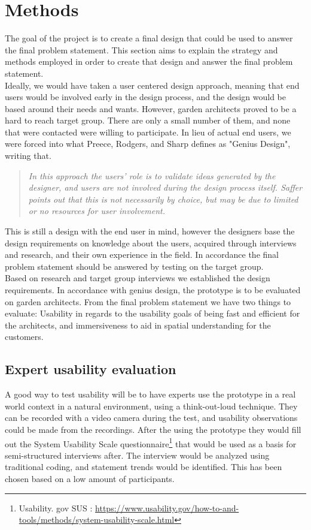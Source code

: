 \chapter{Methods}
\label{chp:methods}
The goal of the project is to create a final design that could be used to answer the final problem statement. This section aims to explain the strategy and methods employed in order to create that design and answer the final problem statement.\\

Ideally, we would have taken a user centered design approach, meaning that end users would be involved early in the design process, and the design would be based around their needs and wants. However, garden architects proved to be a hard to reach target group. There are only a small number of them, and none that were contacted were willing to participate. In lieu of actual end users, we were forced into what Preece, Rodgers, and Sharp defines as "Genius Design"\cite[p.~346]{interactionDesign}, writing that.\\
	\begin{quote}
	\textit{In this approach the users’ role is to validate ideas generated by the designer, and users are not involved during the design process itself. Saffer points out that this is not necessarily by choice, but may be due to limited or no resources for user involvement.}\\
	\end{quote}

This is still a design with the end user in mind, however the designers base the design requirements on knowledge about the users, acquired through interviews and research, and their own experience in the field. In accordance the final problem statement should be answered by testing on the target group.\\

Based on research and target group interviews we established the design requirements. In accordance with genius design, the prototype is to be evaluated on garden architects. From the final problem statement we have two things to evaluate: Usability in regards to the usability goals of being fast and efficient for the architects, and immersiveness to aid in spatial understanding for the customers.

\section{Expert usability evaluation}
A good way to test usability will be to have experts use the prototype in a real world context in a natural environment, using a think-out-loud technique. They can be recorded with a video camera during the test, and usability observations could be made from the recordings. After the using the prototype they would fill out the System Usability Scale questionnaire\footnote{Usability. gov SUS : \url{https://www.usability.gov/how-to-and-tools/methods/system-usability-scale.html}} that would be used as a basis for semi-structured interviews after. The interview would be analyzed using traditional coding, and statement trends would be identified. This has been chosen based on a low amount of participants.

